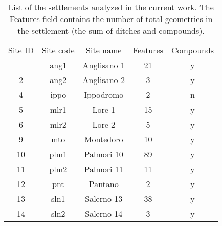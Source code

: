 \begin{table}[!htb]
    \centering
    \begin{tabular}{ccccc}
        \toprule
        Site ID    &    Site code    & Site name            & Features & Compounds \\
        \otoprule
        1          &    ang1         & Anglisano 1          & 21       & y \\
        2          &    ang2         & Anglisano 2          & 3        & y \\
        4          &    ippo         & Ippodromo            & 2        & n \\
        5          &    mlr1         & Lore 1               & 15       & y \\
        6          &    mlr2         & Lore 2               & 5        & y \\
        9          &    mto          & Montedoro            & 10       & y \\
        10         &    plm1         & Palmori 10           & 89       & y \\
        11         &    plm2         & Palmori 11           & 11       & y \\
        12         &    pnt          & Pantano              & 2        & y \\
        13         &    sln1         & Salerno 13           & 38       & y \\
        14         &    sln2         & Salerno 14           & 3        & y \\
        \bottomrule
    \end{tabular}
    \caption[List of the settlements analyzed in the current work]{List of the settlements analyzed in the current work. The \textsf{Features} field contains the number of total geometries in the settlement (the sum of ditches and compounds).
    \label{tab:sites}
    }
\end{table}
